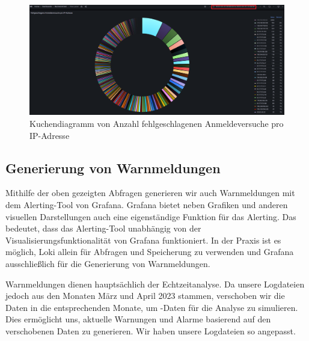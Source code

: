 \newpage
{}
\thispagestyle{lscape}
\begin{landscape}
    \begin{figure}[H]
        \centerline{\includegraphics[width=1.6\textwidth]{assets/Failed_pro_ip2.png}}
        \caption[Kuchendiagramm von Anzahl fehlgeschlagenen Anmeldeversuche pro IP-Adresse]
        {Kuchendiagramm von Anzahl fehlgeschlagenen Anmeldeversuche pro IP-Adresse}
        \label{fig:1_Anmeldung_IPAdresseOhne194}
        \centering
    \end{figure}
\end{landscape}
\restoregeometry




\subsection{Generierung von Warnmeldungen}

Mithilfe der oben gezeigten Abfragen generieren wir auch Warnmeldungen mit dem Alerting-Tool von Grafana. Grafana bietet neben Grafiken und anderen visuellen Darstellungen auch eine eigenständige Funktion für das Alerting. Das bedeutet, dass das Alerting-Tool unabhängig von der Visualisierungsfunktionalität von Grafana funktioniert. In der Praxis ist es möglich, Loki allein für Abfragen und Speicherung zu verwenden und Grafana ausschließlich für die Generierung von Warnmeldungen.

Warnmeldungen dienen hauptsächlich der Echtzeitanalyse. Da unsere Logdateien jedoch aus den Monaten März und April 2023 stammen, verschoben wir die Daten in die entsprechenden Monate, um -Daten für die Analyse zu simulieren. Dies ermöglicht uns, aktuelle Warnungen und Alarme basierend auf den verschobenen Daten zu generieren. Wir haben unsere Logdateien so angepasst.

